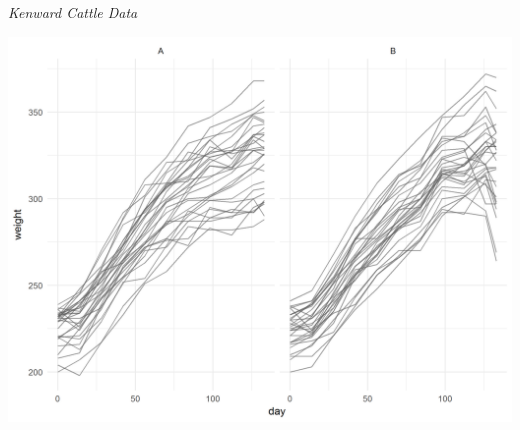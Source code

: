


\begin{frame}[c]{\textit{Kenward Cattle Data}}

\begin{center}
\includegraphics[width = .9\textwidth]{img/cattle/cattle-weights-vs-time-by-trt}
\end{center}
\end{frame}


